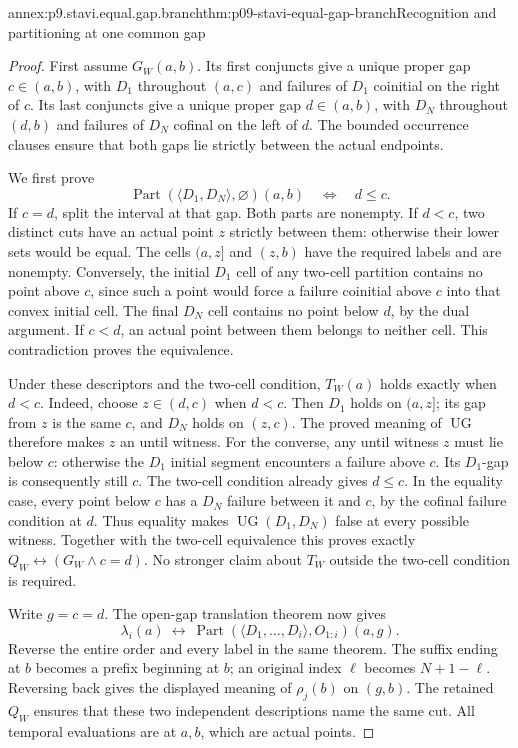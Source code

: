 \begin{annexitem}{annex:p9.stavi.equal.gap.branch}{thm:p09-stavi-equal-gap-branch}{Recognition and partitioning at one common gap}
\begin{proof}
First assume \(G_W(a,b)\). Its first
conjuncts give a unique proper gap
\(c\in(a,b)\), with \(D_1\) throughout
\((a,c)\) and failures of \(D_1\)
coinitial on the right of \(c\).
Its last conjuncts give a unique
proper gap \(d\in(a,b)\), with \(D_N\)
throughout \((d,b)\) and failures of
\(D_N\) cofinal on the left of \(d\).
The bounded occurrence clauses ensure
that both gaps lie strictly between
the actual endpoints.

We first prove
\[
 \operatorname{Part}(\langle D_1,D_N\rangle,\varnothing)(a,b)
                         \quad\Longleftrightarrow\quad d\leq c.
\]
If \(c=d\), split the interval at
that gap. Both parts are nonempty.
If \(d<c\), two distinct cuts have
an actual point \(z\) strictly
between them: otherwise their lower
sets would be equal. The cells
\((a,z]\) and \((z,b)\) have the
required labels and are nonempty.
Conversely, the initial \(D_1\) cell
of any two-cell partition contains
no point above \(c\), since such
a point would force a failure
coinitial above \(c\) into that
convex initial cell. The final
\(D_N\) cell contains no point
below \(d\), by the dual argument.
If \(c<d\), an actual point between
them belongs to neither cell.
This contradiction proves the
equivalence.

Under these descriptors and
the two-cell condition,
\(T_W(a)\) holds exactly when
\(d<c\). Indeed, choose
\(z\in(d,c)\) when \(d<c\).
Then \(D_1\) holds on \((a,z]\);
its gap from \(z\) is the same
\(c\), and \(D_N\) holds on
\((z,c)\). The proved meaning of
\(\operatorname{UG}\) therefore
makes \(z\) an until witness.
For the converse, any until
witness \(z\) must lie below
\(c\): otherwise the \(D_1\)
initial segment encounters a
failure above \(c\). Its
\(D_1\)-gap is consequently
still \(c\). The two-cell
condition already gives
\(d\leq c\). In the equality
case, every point below \(c\)
has a \(D_N\) failure between
it and \(c\), by the cofinal
failure condition at \(d\).
Thus equality
makes \(\operatorname{UG}(D_1,D_N)\)
false at every possible witness.
Together with the two-cell
equivalence this proves exactly
\(Q_W\leftrightarrow(G_W\land c=d)\).
No stronger claim about \(T_W\)
outside the two-cell condition
is required.

Write \(g=c=d\). The open-gap
translation theorem now gives
\[
 \lambda_i(a)\ \longleftrightarrow\
             \operatorname{Part}(\langle D_1,\ldots,D_i\rangle,O_{1:i})(a,g).
\]
Reverse the entire order and
every label in the same theorem.
The suffix ending at \(b\)
becomes a prefix beginning at
\(b\); an original index \(\ell\)
becomes \(N+1-\ell\). Reversing
back gives the displayed
meaning of \(\rho_j(b)\) on
\((g,b)\). The retained \(Q_W\)
ensures that these two independent
descriptions name the same cut.
All temporal evaluations are
at \(a,b\), which are actual
points.


\end{proof}
\end{annexitem}
